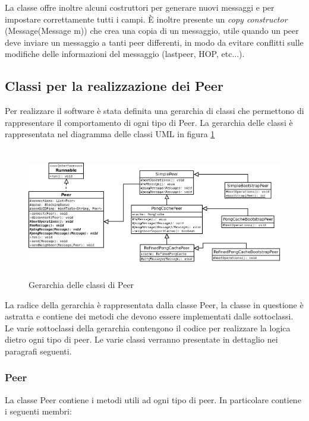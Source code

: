 \documentclass[a4paper,11pt]{article}
\begin{document}
La classe offre inoltre alcuni costruttori per generare nuovi messaggi e per impostare correttamente tutti i campi. \`E inoltre presente un \emph{copy constructor} (\textsf{Message(Message m)}) che crea una copia di un messaggio, utile quando un peer deve inviare un messaggio a tanti peer differenti, in modo da evitare conflitti sulle modifiche delle informazioni del messaggio (\textsf{lastpeer}, \textsf{HOP}, etc...).

\subsection{Classi per la realizzazione dei \textsf{Peer}}

Per realizzare il software \`e stata definita una gerarchia di classi che permettono di rappresentare il comportamento di ogni tipo di Peer. La gerarchia delle classi \`e rappresentata nel diagramma delle classi UML in figura \ref{img:uml}

\begin{figure}[ht]
\centering
\includegraphics[height=5.7cm]{peers.png}
\caption{\small{Gerarchia delle classi di \textsf{Peer}}}
\label{img:uml}
\end{figure}

La radice della gerarchia \`e rappresentata dalla classe \textsf{Peer}, la classe in questione \`e astratta e contiene dei metodi che devono essere implementati dalle sottoclassi. Le varie sottoclassi della gerarchia contengono il codice per realizzare la logica dietro ogni tipo di peer. Le varie classi verranno presentate in dettaglio nei paragrafi seguenti.

\subsubsection{\textsf{Peer}}

La classe \textsf{Peer} contiene i metodi utili ad ogni tipo di peer. In particolare contiene i seguenti membri:
\end{document}
